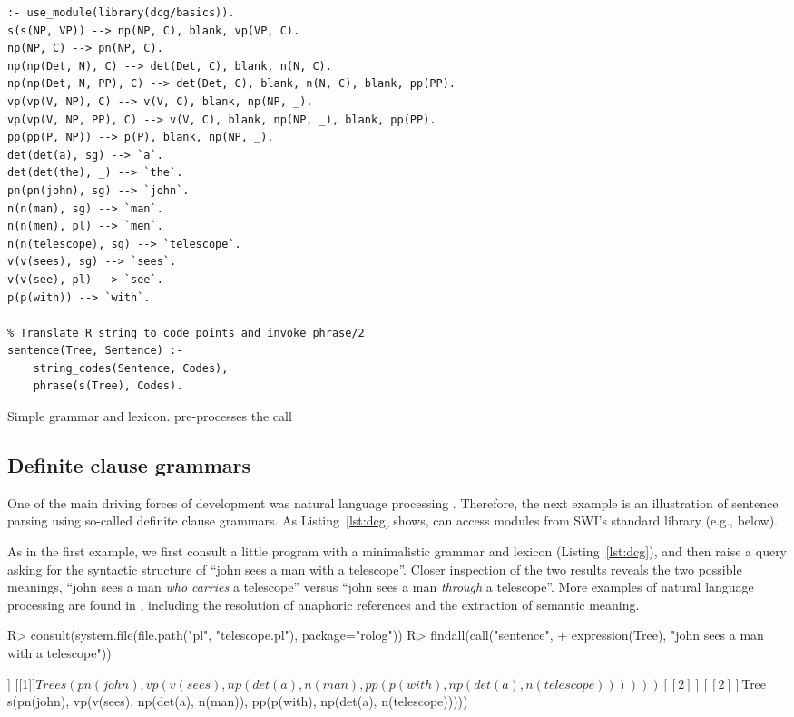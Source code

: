 \documentclass[article]{jss}
\begin{document}
\begin{listing}[th]
\begin{verbatim}
:- use_module(library(dcg/basics)).
s(s(NP, VP)) --> np(NP, C), blank, vp(VP, C).
np(NP, C) --> pn(NP, C).
np(np(Det, N), C) --> det(Det, C), blank, n(N, C).
np(np(Det, N, PP), C) --> det(Det, C), blank, n(N, C), blank, pp(PP).
vp(vp(V, NP), C) --> v(V, C), blank, np(NP, _).
vp(vp(V, NP, PP), C) --> v(V, C), blank, np(NP, _), blank, pp(PP).
pp(pp(P, NP)) --> p(P), blank, np(NP, _).
det(det(a), sg) --> `a`.
det(det(the), _) --> `the`.
pn(pn(john), sg) --> `john`.
n(n(man), sg) --> `man`.
n(n(men), pl) --> `men`.
n(n(telescope), sg) --> `telescope`.
v(v(sees), sg) --> `sees`.
v(v(see), pl) --> `see`.
p(p(with)) --> `with`.

% Translate R string to code points and invoke phrase/2
sentence(Tree, Sentence) :-
    string_codes(Sentence, Codes),
    phrase(s(Tree), Codes).
\end{verbatim}
\caption{Simple grammar and lexicon.  pre-processes the  call}
\label{lst:dcg}
\end{listing}

\subsection{Definite clause grammars}

One of the main driving forces of  development was natural
language processing \citep{Dahl1981}. Therefore, the next example is an
illustration of sentence parsing using so-called definite clause grammars. As
Listing~\ref{lst:dcg} shows,  can access modules from SWI's standard
library (e.g.,  below).

As in the first example, we first consult a little  program 
with a minimalistic grammar and lexicon (Listing~\ref{lst:dcg}), and then raise
a query asking for the syntactic structure of ``john sees a man with a 
telescope''. Closer inspection of the two results reveals the two possible
meanings, ``john sees a man \emph{who carries} a telescope'' versus ``john sees
a man \emph{through} a telescope''. More  examples of natural
language processing are found in \citet{Blackburn2005}, 
including the resolution of anaphoric references and the extraction of semantic
meaning.

\begin{Schunk}
\begin{Sinput}
R> consult(system.file(file.path("pl", "telescope.pl"), package="rolog"))
R> findall(call("sentence", 
+               expression(Tree), "john sees a man with a telescope"))
\end{Sinput}
\begin{Soutput}
[[1]]
[[1]]$Tree
s(pn(john), vp(v(sees), np(det(a), n(man), pp(p(with), np(det(a), 
    n(telescope))))))


[[2]]
[[2]]$Tree
s(pn(john), vp(v(sees), np(det(a), n(man)), pp(p(with), np(det(a), 
    n(telescope)))))
\end{Soutput}
\end{Schunk}
\end{document}
